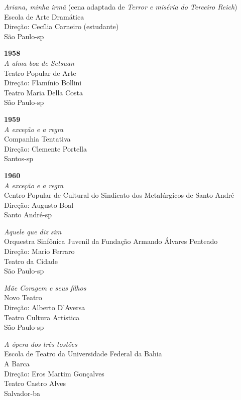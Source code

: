 {\it Ariana, minha irmã} (cena adaptada de {\it Terror e miséria do
Terceiro Reich})\\
Escola de Arte Dramática\\
Direção: Cecília Carneiro (estudante)\\
São Paulo-{\sc sp}

\item{\bf 1958}\\
{\it A alma boa de Setsuan}\\
Teatro Popular de Arte\\
Direção: Flamínio Bollini\\
Teatro Maria Della Costa\\
São Paulo-{\sc sp}

\item{\bf 1959}\\
{\it A exceção e a regra}\\
Companhia Tentativa\\
Direção: Clemente Portella\\
Santos-{\sc sp}

\item{\bf 1960}\\
{\it A exceção e a regra}\\
Centro Popular de Cultural do Sindicato dos Metalúrgicos de Santo André\\
Direção: Augusto Boal\\
Santo André-{\sc sp}

{\it Aquele que diz sim}\\
Orquestra Sinfônica Juvenil da Fundação Armando Álvares Penteado\\
Direção: Mario Ferraro\\
Teatro da Cidade\\
São Paulo-{\sc sp}

{\it Mãe Coragem e seus filhos}\\
Novo Teatro\\
Direção: Alberto D'Aversa\\
Teatro Cultura Artística\\
São Paulo-{\sc sp}

{\it A ópera dos três tostões}\\
Escola de Teatro da Universidade Federal da Bahia\\
A Barca\\
Direção: Eros Martim Gonçalves\\
Teatro Castro Alves\\
Salvador-{\sc ba}

